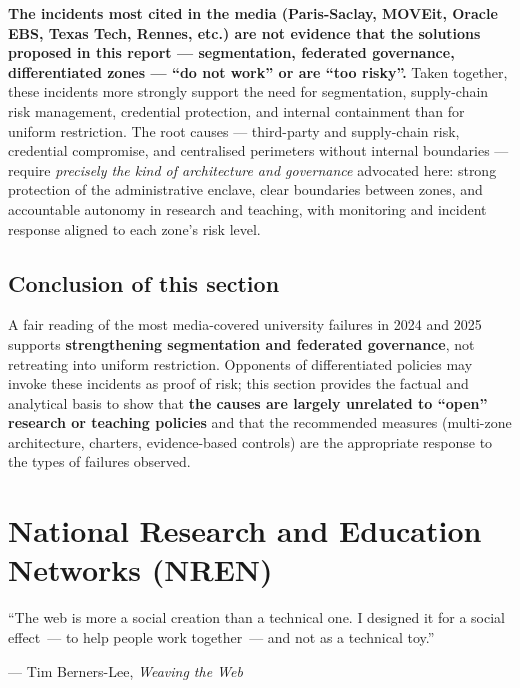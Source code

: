 \begin{tcolorbox}[
    colback=OliveGreen!5!white,
    colframe=OliveGreen!75!black,
    title=\textbf{Key takeaway},
    breakable
]
\textbf{The incidents most cited in the media (Paris-Saclay, MOVEit,
Oracle EBS, Texas Tech, Rennes, etc.) are not evidence that the
solutions proposed in this report --- segmentation, federated
governance, differentiated zones --- ``do not work'' or are ``too
risky''.} Taken together, these incidents more strongly support the
need for segmentation, supply-chain risk management, credential
protection, and internal containment than for uniform restriction.
The root causes --- third-party and supply-chain risk, credential
compromise, and centralised perimeters without internal boundaries
--- require \emph{precisely the kind of architecture and governance}
advocated here: strong
protection of the administrative enclave, clear boundaries between
zones, and accountable autonomy in research and teaching, with
monitoring and incident response aligned to each zone's risk level.
\end{tcolorbox}

\subsection{Conclusion of this section}

A fair reading of the most media-covered university failures in 2024 and
2025 supports \textbf{strengthening segmentation and federated
governance}, not retreating into uniform restriction. Opponents of
differentiated policies may invoke these incidents as proof of risk;
this section provides the factual and analytical basis to show that
\textbf{the causes are largely unrelated to ``open'' research or
teaching policies} and that the recommended measures (multi-zone
architecture, charters, evidence-based controls) are the appropriate
response to the types of failures observed.

\section{National Research and Education Networks (NREN)}
\label{sec:nren}

\epigraph{``The web is more a social creation than a technical one. I designed it for a social effect~--- to help people work together~--- and not as a technical toy.''}{--- Tim Berners-Lee, \textit{Weaving the Web}~\cite{bernerslee1999}}

